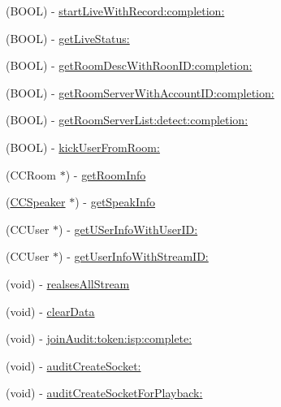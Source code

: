 \begin{DoxyCompactItemize}
\item 
(B\+O\+OL) -\/ \hyperlink{interface_c_c_streamer_basic_a1a7e5e90d65f3a07b6de817b120e6f2a}{start\+Live\+With\+Record\+:completion\+:}
\item 
(B\+O\+OL) -\/ \hyperlink{interface_c_c_streamer_basic_a572cf57c93623e0eaf87514737db5729}{get\+Live\+Status\+:}
\item 
(B\+O\+OL) -\/ \hyperlink{interface_c_c_streamer_basic_a566714939c10eebc3def763308ad2e41}{get\+Room\+Desc\+With\+Roon\+I\+D\+:completion\+:}
\item 
(B\+O\+OL) -\/ \hyperlink{interface_c_c_streamer_basic_ac4a54455af6e7d3974a59892244df2df}{get\+Room\+Server\+With\+Account\+I\+D\+:completion\+:}
\item 
(B\+O\+OL) -\/ \hyperlink{interface_c_c_streamer_basic_a5386b0515a0ef68004f343079d5d3d5f}{get\+Room\+Server\+List\+:detect\+:completion\+:}
\item 
(B\+O\+OL) -\/ \hyperlink{interface_c_c_streamer_basic_ab32594777e441a8edf1f93b1135d9204}{kick\+User\+From\+Room\+:}
\item 
(C\+C\+Room $\ast$) -\/ \hyperlink{interface_c_c_streamer_basic_a3d9a24ed847067f8f71c815d5ce6c60e}{get\+Room\+Info}
\item 
(\hyperlink{interface_c_c_speaker}{C\+C\+Speaker} $\ast$) -\/ \hyperlink{interface_c_c_streamer_basic_a93ffb49f4b1a3cbbbeb89ec1927f60b7}{get\+Speak\+Info}
\item 
(C\+C\+User $\ast$) -\/ \hyperlink{interface_c_c_streamer_basic_aca867160cb49c555e62bd5b18e7ed279}{get\+U\+Ser\+Info\+With\+User\+I\+D\+:}
\item 
(C\+C\+User $\ast$) -\/ \hyperlink{interface_c_c_streamer_basic_ad0c98fb251203fb7531ecdabbe3ae84f}{get\+User\+Info\+With\+Stream\+I\+D\+:}
\item 
(void) -\/ \hyperlink{interface_c_c_streamer_basic_a1023b14df6914c3190d89c5cddbea14c}{realses\+All\+Stream}
\item 
(void) -\/ \hyperlink{interface_c_c_streamer_basic_ae3d13a9970f532c7bd630f98ecfc00bd}{clear\+Data}
\item 
(void) -\/ \hyperlink{interface_c_c_streamer_basic_a3c49ff3e0e96a1001913c6cd9a0ebc36}{join\+Audit\+:token\+:isp\+:complete\+:}
\item 
(void) -\/ \hyperlink{interface_c_c_streamer_basic_ad0107408438386061abe80c874918287}{audit\+Create\+Socket\+:}
\item 
(void) -\/ \hyperlink{interface_c_c_streamer_basic_af982e16a8c40013832a86f96d9af7d62}{audit\+Create\+Socket\+For\+Playback\+:}
\end{DoxyCompactItemize}
